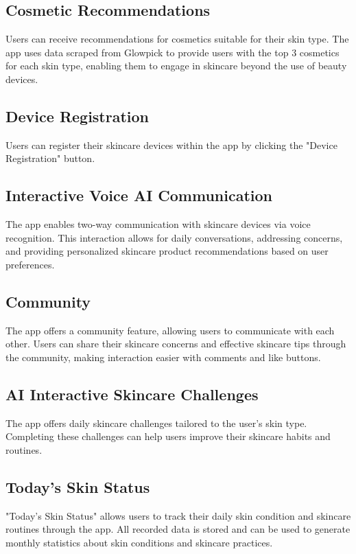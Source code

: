 \documentclass[conference]{IEEEtran}
\begin{document}
\subsection{Cosmetic Recommendations}
Users can receive recommendations for cosmetics suitable for their skin type. The app uses data scraped from Glowpick to provide users with the top 3 cosmetics for each skin type, enabling them to engage in skincare beyond the use of beauty devices.\\
\subsection{Device Registration}
Users can register their skincare devices within the app by clicking the "Device Registration" button. \\
\subsection{Interactive Voice AI Communication}
The app enables two-way communication with skincare devices via voice recognition. This interaction allows for daily conversations, addressing concerns, and providing personalized skincare product recommendations based on user preferences.\\
\subsection{Community}
The app offers a community feature, allowing users to communicate with each other. Users can share their skincare concerns and effective skincare tips through the community, making interaction easier with comments and like buttons. \\
\subsection{AI Interactive Skincare Challenges}
The app offers daily skincare challenges tailored to the user's skin type. Completing these challenges can help users improve their skincare habits and routines. \\
\subsection{Today's Skin Status}
"Today's Skin Status" allows users to track their daily skin condition and skincare routines through the app. All recorded data is stored and can be used to generate monthly statistics about skin conditions and skincare practices.\\
\end{document}
